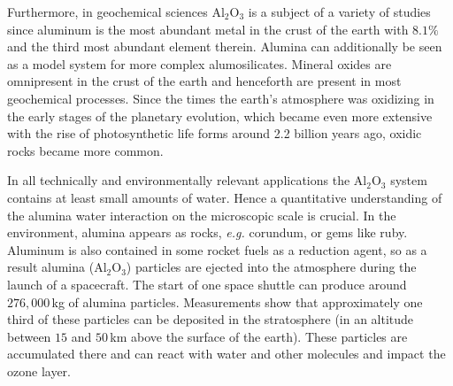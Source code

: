 \documentclass[11pt,DIV=13,BCOR=5mm,a4paper,headinclude]{scrbook}
\begin{document}
Furthermore, in geochemical sciences Al$_2$O$_3$ is a subject of a variety of studies since aluminum is the most abundant metal in the crust of the earth with  $8.1\%$ %
and the third most abundant element therein\cite{dtv-Atlas,Riedel}.
Alumina can additionally be seen as a model system for more complex alumosilicates.
Mineral oxides are omnipresent in the crust of the earth and henceforth are present in most geochemical processes.
Since the times the earth's atmosphere was oxidizing in the early stages of the planetary evolution\cite{Trail2011}, which became even more extensive with the rise of photosynthetic life forms\cite{Frei2009,Buick2008,Olson2006} around 2.2 billion years ago\cite{Kirschvink2008}, oxidic rocks became more common.


In all technically and environmentally relevant applications the Al$_2$O$_3$ system contains at least small amounts of water.
Hence a quantitative understanding of the alumina water interaction on the microscopic scale is crucial.
In the environment, alumina appears as rocks, \textit{e.g.} corundum, or gems like ruby.
Aluminum is also contained in some rocket fuels as a reduction agent, so as a result alumina (Al$_2$O$_3$) particles are ejected into the atmosphere during the launch of a spacecraft\cite{Elam1998}.
The start of one space shuttle can produce around $276,000\,$kg of alumina particles\cite{Potter1978}.
Measurements show that approximately one third of these particles can be deposited in the stratosphere\cite{Cofer1978} (in an altitude between $15$ and $50\,$km above the surface of the earth).
These particles are accumulated there and can react with water and other molecules\cite{Jones1995,Jackman1996} and impact the ozone layer.
\end{document}

